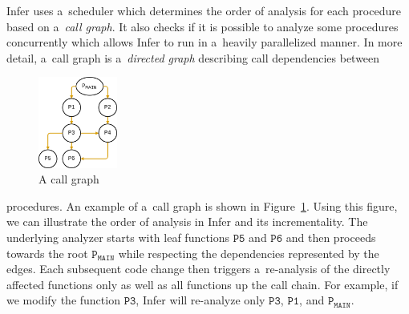 \documentclass{ExcelAtFIT}
\begin{document}



Infer uses a~scheduler which determines the order of 
analysis for each procedure based on a~\textit{call graph}.
It also checks if it is possible to analyze some procedures
concurrently which allows Infer to run in a~heavily 
parallelized manner.
In more detail, a~call graph is a~\emph{directed graph}
describing call dependencies between
\begin{figure}
	\centering
	\includegraphics[width=0.23\textwidth]{images/infer/callgraph.png}
	\caption{A call graph}
	\label{fig:infer-callgraph}
\end{figure}
procedures. An example of a~call graph is shown in
Figure~\ref{fig:infer-callgraph}. Using this figure, we can illustrate
the order of analysis in Infer and its incrementality. 
The underlying analyzer starts with leaf functions $\mathtt{P5}$
and $\mathtt{P6}$
and then proceeds
towards the root $\mathtt{P_{MAIN}}$ while respecting
the dependencies represented by the edges. 
Each subsequent code change then triggers
a~re-analysis of the directly affected functions only
as well as all functions up the call chain. For example,
if we modify the function $\mathtt{P3}$, Infer
will re-analyze only $\mathtt{P3}$,
$\mathtt{P1}$, and $\mathtt{P_{MAIN}}$.
\end{document}
